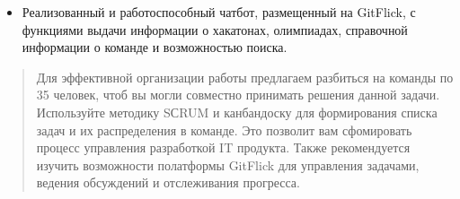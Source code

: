 \documentclass[letterpaper,10pt,russian]{sphinxmanual}
\begin{document}
\sphinxAtStartPar
{}
\begin{itemize}
\item {} 
\sphinxAtStartPar
Реализованный и работоспособный чат\sphinxhyphen{}бот, размещенный на GitFlick, с функциями выдачи информации о хакатонах, олимпиадах, справочной информации о команде и возможностью поиска.

\end{itemize}
\begin{quote}

\sphinxAtStartPar
{} Для эффективной организации работы предлагаем разбиться на команды по 3\sphinxhyphen{}5 человек, чтоб вы могли совместно принимать решения данной задачи. Используйте методику SСRUM и канбан\sphinxhyphen{}доску для формирования списка задач и их распределения в команде. Это позволит вам сфомировать процесс управления разработкой IT продукта. Также рекомендуется изучить возможности полатформы GitFlick для управления задачами, ведения обсуждений и отслеживания прогресса.
\end{quote}

\sphinxstepscope
\end{document}
